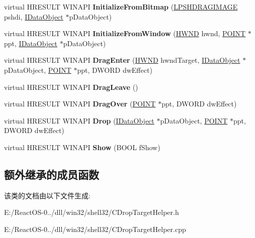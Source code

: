 \begin{DoxyCompactItemize}
\item 
\mbox{\label{class_c_drop_target_helper_a930cc3825612dce46e2d30a93415b707}} 
virtual H\+R\+E\+S\+U\+LT W\+I\+N\+A\+PI {\bfseries Initialize\+From\+Bitmap} (\hyperlink{struct_i_drag_source_helper_1_1_s_h_d_r_a_g_i_m_a_g_e}{L\+P\+S\+H\+D\+R\+A\+G\+I\+M\+A\+GE} pshdi, \hyperlink{interface_i_data_object}{I\+Data\+Object} $\ast$p\+Data\+Object)
\item 
\mbox{\label{class_c_drop_target_helper_a9230551dc27df27539f02b6183f4f853}} 
virtual H\+R\+E\+S\+U\+LT W\+I\+N\+A\+PI {\bfseries Initialize\+From\+Window} (\hyperlink{interfacevoid}{H\+W\+ND} hwnd, \hyperlink{structtag_p_o_i_n_t}{P\+O\+I\+NT} $\ast$ppt, \hyperlink{interface_i_data_object}{I\+Data\+Object} $\ast$p\+Data\+Object)
\item 
\mbox{\label{class_c_drop_target_helper_af11fa76392815d5c6445bb245cc7893e}} 
virtual H\+R\+E\+S\+U\+LT W\+I\+N\+A\+PI {\bfseries Drag\+Enter} (\hyperlink{interfacevoid}{H\+W\+ND} hwnd\+Target, \hyperlink{interface_i_data_object}{I\+Data\+Object} $\ast$p\+Data\+Object, \hyperlink{structtag_p_o_i_n_t}{P\+O\+I\+NT} $\ast$ppt, D\+W\+O\+RD dw\+Effect)
\item 
\mbox{\label{class_c_drop_target_helper_a4e99aca9b860157f82a6fa787974207c}} 
virtual H\+R\+E\+S\+U\+LT W\+I\+N\+A\+PI {\bfseries Drag\+Leave} ()
\item 
\mbox{\label{class_c_drop_target_helper_a37256360b09efb67e8464e289e75d5f3}} 
virtual H\+R\+E\+S\+U\+LT W\+I\+N\+A\+PI {\bfseries Drag\+Over} (\hyperlink{structtag_p_o_i_n_t}{P\+O\+I\+NT} $\ast$ppt, D\+W\+O\+RD dw\+Effect)
\item 
\mbox{\label{class_c_drop_target_helper_a22d8eee862d6af3685cf4213a23df703}} 
virtual H\+R\+E\+S\+U\+LT W\+I\+N\+A\+PI {\bfseries Drop} (\hyperlink{interface_i_data_object}{I\+Data\+Object} $\ast$p\+Data\+Object, \hyperlink{structtag_p_o_i_n_t}{P\+O\+I\+NT} $\ast$ppt, D\+W\+O\+RD dw\+Effect)
\item 
\mbox{\label{class_c_drop_target_helper_a6a1d99bf78a9103b3eeb6fdddfca45f8}} 
virtual H\+R\+E\+S\+U\+LT W\+I\+N\+A\+PI {\bfseries Show} (B\+O\+OL f\+Show)
\end{DoxyCompactItemize}
\subsection*{额外继承的成员函数}


该类的文档由以下文件生成\+:\begin{DoxyCompactItemize}
\item 
E\+:/\+React\+O\+S-\/0../dll/win32/shell32/C\+Drop\+Target\+Helper.\+h\item 
E\+:/\+React\+O\+S-\/0../dll/win32/shell32/C\+Drop\+Target\+Helper.\+cpp\end{DoxyCompactItemize}
